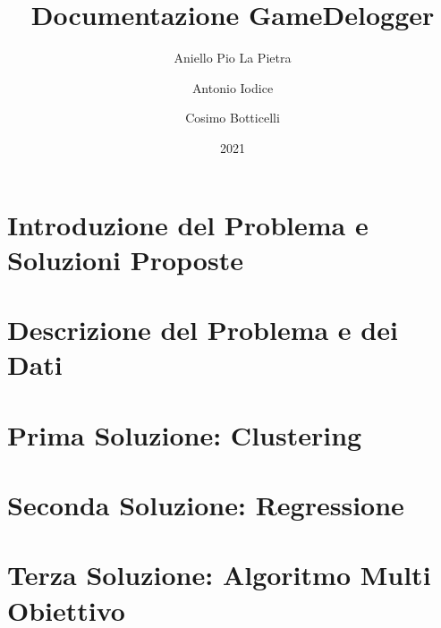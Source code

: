 \documentclass[12pt]{report}
\title{Documentazione GameDelogger}
\author{Aniello Pio La Pietra \and Antonio Iodice \and Cosimo Botticelli}
\date{2021}
\begin{document}
\maketitle
\tableofcontents


\chapter{Introduzione del Problema e Soluzioni Proposte}


\chapter{Descrizione del Problema e dei Dati}


\chapter{Prima Soluzione: Clustering}


\chapter{Seconda Soluzione: Regressione}


\chapter{Terza Soluzione: Algoritmo Multi Obiettivo}

\end{document}
